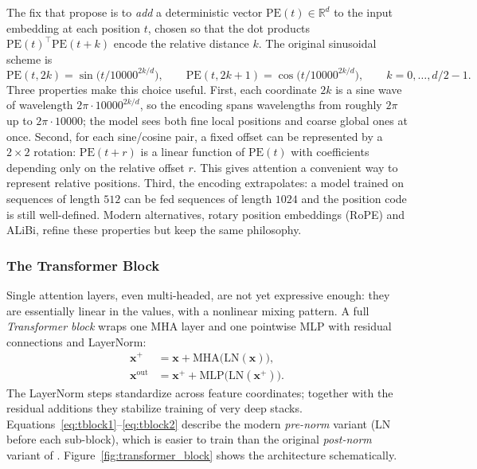 \documentclass[11pt,a4paper]{report}
\newcommand{\x}{\bm{x}}
\newcommand{\R}{\mathbb{R}}
\begin{document}
The fix that \citet{vaswani2017attention} propose is to \emph{add} a deterministic vector $\mathrm{PE}(t)\in\R^d$ to the input embedding at each position $t$, chosen so that the dot products $\mathrm{PE}(t)^\top \mathrm{PE}(t+k)$ encode the relative distance $k$.  The original sinusoidal scheme is
\begin{equation}
\mathrm{PE}(t, 2k) = \sin\!\big(t/10000^{2k/d}\big),
\qquad
\mathrm{PE}(t, 2k+1) = \cos\!\big(t/10000^{2k/d}\big),
\qquad k=0,\ldots,d/2-1.
\end{equation}
Three properties make this choice useful.  First, each coordinate $2k$ is a sine wave of wavelength $2\pi \cdot 10000^{2k/d}$, so the encoding spans wavelengths from roughly $2\pi$ up to $2\pi \cdot 10000$; the model sees both fine local positions and coarse global ones at once.  Second, for each sine/cosine pair, a fixed offset can be represented by a $2\times2$ rotation: $\mathrm{PE}(t+r)$ is a linear function of $\mathrm{PE}(t)$ with coefficients depending only on the relative offset $r$.  This gives attention a convenient way to represent relative positions.  Third, the encoding extrapolates: a model trained on sequences of length $512$ can be fed sequences of length $1024$ and the position code is still well-defined.  Modern alternatives, rotary position embeddings (RoPE) and ALiBi, refine these properties but keep the same philosophy.

\subsubsection{The Transformer Block}
\label{sec:transformer_block}

Single attention layers, even multi-headed, are not yet expressive enough: they are essentially linear in the values, with a nonlinear mixing pattern.  A full \emph{Transformer block} wraps one MHA layer and one pointwise MLP with residual connections and LayerNorm:
\begin{align}
\x^{+} &= \x + \mathrm{MHA}\!\big(\mathrm{LN}(\x)\big), \label{eq:tblock1}\\
\x^{\mathrm{out}}  &= \x^{+} + \mathrm{MLP}\!\big(\mathrm{LN}(\x^{+})\big). \label{eq:tblock2}
\end{align}
The LayerNorm steps \citep{ba2016layer} standardize across feature coordinates; together with the residual additions they stabilize training of very deep stacks.  Equations~\eqref{eq:tblock1}--\eqref{eq:tblock2} describe the modern \emph{pre-norm} variant (LN before each sub-block), which is easier to train than the original \emph{post-norm} variant of \citet{vaswani2017attention}.  Figure~\ref{fig:transformer_block} shows the architecture schematically.
\end{document}
